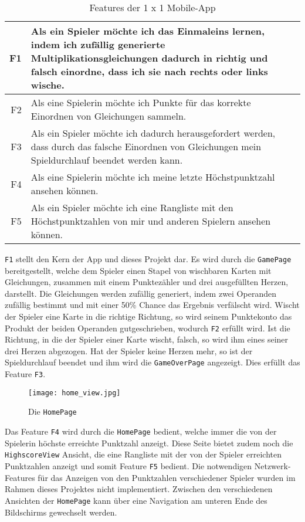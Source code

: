 \begin{table}[ht]
  \begin{tabu}{| >{\ttfamily} r | X |}
    \hline
    F1 & Als ein Spieler möchte ich das Einmaleins lernen, indem ich zufällig generierte Multiplikationsgleichungen dadurch in richtig und falsch einordne, dass ich sie nach rechts oder links wische.\\
    \hline
    F2 & Als eine Spielerin möchte ich Punkte für das korrekte Einordnen von Gleichungen sammeln.\\
    \hline
    F3 & Als ein Spieler möchte ich dadurch herausgefordert werden, dass durch das falsche Einordnen von Gleichungen mein Spieldurchlauf beendet werden kann.\\
    \hline
    F4 & Als eine Spielerin möchte ich meine letzte Höchstpunktzahl ansehen können.\\
    \hline
    F5 & Als ein Spieler möchte ich eine Rangliste mit den Höchstpunktzahlen von mir und anderen Spielern ansehen können.\\
    \hline
  \end{tabu}
  \caption{Features der 1 x 1 Mobile-App}
\end{table}

\texttt{F1} stellt den Kern der App und dieses Projekt dar.
Es wird durch die \texttt{GamePage} bereitgestellt, welche dem Spieler einen Stapel von wischbaren Karten mit Gleichungen, zusammen mit einem Punktezähler und drei ausgefüllten Herzen, darstellt.
Die Gleichungen werden zufällig generiert, indem zwei Operanden zufällig bestimmt und mit einer 50\% Chance das Ergebnis verfälscht wird.
Wischt der Spieler eine Karte in die richtige Richtung, so wird seinem Punktekonto das Produkt der beiden Operanden gutgeschrieben, wodurch \texttt{F2} erfüllt wird.
Ist die Richtung, in die der Spieler einer Karte wischt, falsch, so wird ihm eines seiner drei Herzen abgezogen.
Hat der Spieler keine Herzen mehr, so ist der Spieldurchlauf beendet und ihm wird die \texttt{GameOverPage} angezeigt.
Dies erfüllt das Feature \texttt{F3}.

\begin{wrapfigure}{l}{0.4\textwidth}
  \centering
  \texttt{[image: home\_view.jpg]}
  \caption{Die \texttt{HomePage}}
\end{wrapfigure}

Das Feature \texttt{F4} wird durch die \texttt{HomePage} bedient, welche immer die von der Spielerin höchste erreichte Punktzahl anzeigt.
Diese Seite bietet zudem noch die \texttt{HighscoreView} Ansicht, die eine Rangliste mit der von der Spieler erreichten Punktzahlen anzeigt und somit Feature \texttt{F5} bedient.
Die notwendigen Netzwerk-Features für das Anzeigen von den Punktzahlen verschiedener Spieler wurden im Rahmen dieses Projektes nicht implementiert.
Zwischen den verschiedenen Ansichten der \texttt{HomePage} kann über eine Navigation am unteren Ende des Bildschirms gewechselt werden.

